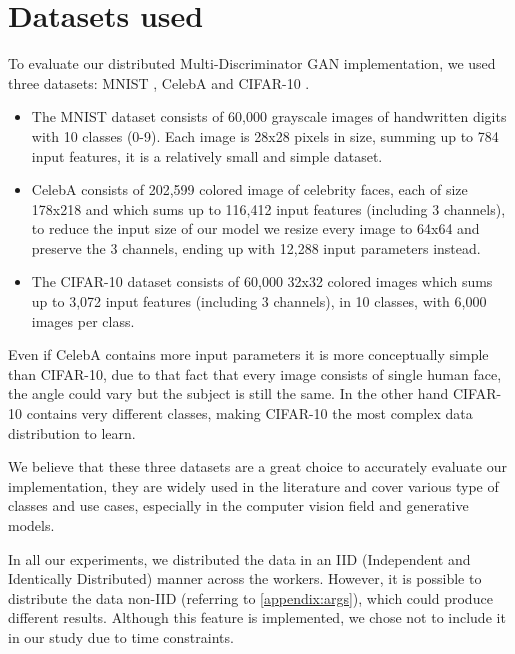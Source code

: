 \section{Datasets used} \label{sec:datasets}
To evaluate our distributed Multi-Discriminator GAN implementation, we used three datasets: MNIST \cite{mnist}, CelebA \cite{celeba} and CIFAR-10 \cite{cifar}.

\begin{itemize}
    \item The MNIST dataset consists of 60,000 grayscale images of handwritten digits with 10 classes (0-9). Each image is 28x28 pixels in size, summing up to 784 input features, it is a relatively small and simple dataset.
    \item CelebA consists of 202,599 colored image of celebrity faces, each of size 178x218 and which sums up to 116,412 input features (including 3 channels), to reduce the input size of our model we resize every image to 64x64 and preserve the 3 channels, ending up with 12,288 input parameters instead.
    \item The CIFAR-10 dataset consists of 60,000 32x32 colored images which sums up to 3,072 input features (including 3 channels), in 10 classes, with 6,000 images per class.
\end{itemize}

Even if CelebA contains more input parameters it is more conceptually simple than CIFAR-10, due to that fact that every image consists of single human face, the angle could vary but the subject is still the same. In the other hand CIFAR-10 contains very different classes, making CIFAR-10 the most complex data distribution to learn.

We believe that these three datasets are a great choice to accurately evaluate our implementation, they are widely used in the literature and cover various type of classes and use cases, especially in the computer vision field and generative models.

In all our experiments, we distributed the data in an IID (Independent and Identically Distributed) manner across the workers. However, it is possible to distribute the data non-IID (referring to \ref{appendix:args}), which could produce different results. Although this feature is implemented, we chose not to include it in our study due to time constraints.


